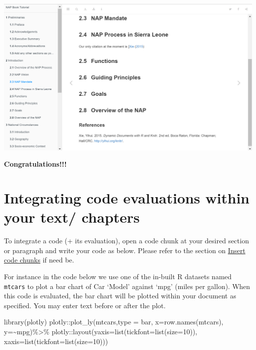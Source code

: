 \documentclass[
]{book}
\newenvironment{Shaded}{\begin{snugshade}}{\end{snugshade}}
\newcommand{\AttributeTok}[1]{\textcolor[rgb]{0.77,0.63,0.00}{#1}}
\newcommand{\DecValTok}[1]{\textcolor[rgb]{0.00,0.00,0.81}{#1}}
\newcommand{\FunctionTok}[1]{\textcolor[rgb]{0.00,0.00,0.00}{#1}}
\newcommand{\NormalTok}[1]{#1}
\newcommand{\SpecialCharTok}[1]{\textcolor[rgb]{0.00,0.00,0.00}{#1}}
\newcommand{\StringTok}[1]{\textcolor[rgb]{0.31,0.60,0.02}{#1}}
\let\origfigure\figure
\let\endorigfigure\endfigure
\renewenvironment{figure}[1][2] {
    \expandafter\origfigure\expandafter[H]
} {
    \endorigfigure
}
\begin{document}
\begin{figure}
\centering
\includegraphics{tutorial_screenshots/reference_incl.png}
\caption{citation added to ref}
\end{figure}

\textbf{Congratulations!!!}

\hypertarget{integrating-code-evaluations-within-your-text-chapters}{%
\section{Integrating code evaluations within your text/ chapters}\label{integrating-code-evaluations-within-your-text-chapters}}

To integrate a code (+ its evaluation), open a code chunk at your desired section or paragraph and write your code as below. Please refer to the section on \protect\hyperlink{insert-code-chunks}{Insert code chunks} if need be.

For instance in the code below we use one of the in-built R datasets named \texttt{mtcars} to plot a bar chart of Car `Model' against `mpg' (miles per gallon).
When this code is evaluated, the bar chart will be plotted within your document as specified. You may enter text before or after the plot.

\begin{Shaded}
\begin{Highlighting}[]
\FunctionTok{library}\NormalTok{(plotly)}
\NormalTok{plotly}\SpecialCharTok{::}\FunctionTok{plot\_ly}\NormalTok{(mtcars,}\AttributeTok{type =} \StringTok{\textquotesingle{}bar\textquotesingle{}}\NormalTok{, }
                \AttributeTok{x=}\FunctionTok{row.names}\NormalTok{(mtcars), }\AttributeTok{y=}\SpecialCharTok{\textasciitilde{}}\NormalTok{mpg)}\SpecialCharTok{\%\textgreater{}\%}
\NormalTok{  plotly}\SpecialCharTok{::}\FunctionTok{layout}\NormalTok{(}\AttributeTok{yaxis=}\FunctionTok{list}\NormalTok{(}\AttributeTok{tickfont=}\FunctionTok{list}\NormalTok{(}\AttributeTok{size=}\DecValTok{10}\NormalTok{)),}
                 \AttributeTok{xaxis=}\FunctionTok{list}\NormalTok{(}\AttributeTok{tickfont=}\FunctionTok{list}\NormalTok{(}\AttributeTok{size=}\DecValTok{10}\NormalTok{)))}
\end{Highlighting}
\end{Shaded}
\end{document}
